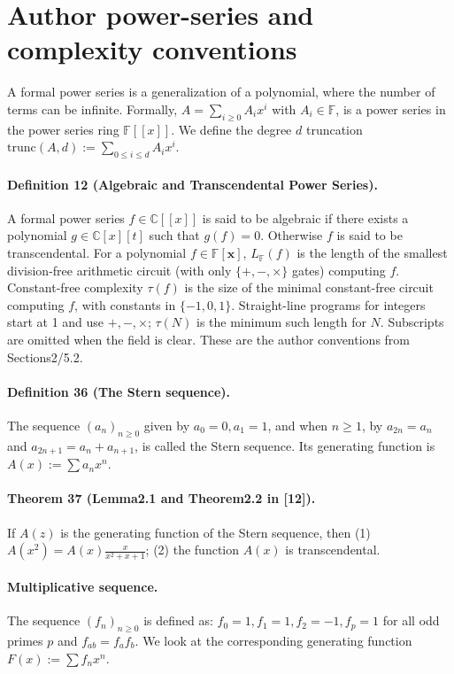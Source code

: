 \section*{Author power-series and complexity conventions}
A formal power series is a generalization of a polynomial, where the number of terms can be infinite. Formally, $A=\sum_{i\ge0}A_ix^i$ with $A_i\in\mathbb F$, is a power series in the power series ring $\mathbb F[[x]]$. We define the degree $d$ truncation $\mathrm{trunc}(A,d):=\sum_{0\le i\le d}A_ix^i$.
\paragraph{Definition 12 (Algebraic and Transcendental Power Series).} A formal power series $f\in\mathbb C[[x]]$ is said to be algebraic if there exists a polynomial $g\in\mathbb C[x][t]$ such that $g(f)=0$. Otherwise $f$ is said to be transcendental.
For a polynomial $f\in\mathbb F[\mathbf x]$, $L_{\mathbb F}(f)$ is the length of the smallest division-free arithmetic circuit (with only $\{+,-,\times\}$ gates) computing $f$. Constant-free complexity $\tau(f)$ is the size of the minimal constant-free circuit computing $f$, with constants in $\{-1,0,1\}$. Straight-line programs for integers start at 1 and use $+,-,\times$; $\tau(N)$ is the minimum such length for $N$. Subscripts are omitted when the field is clear. These are the author conventions from Sections2/5.2.
\paragraph{Definition 36 (The Stern sequence).} The sequence $(a_n)_{n\ge0}$ given by $a_0=0,a_1=1$, and when $n\ge1$, by $a_{2n}=a_n$ and $a_{2n+1}=a_n+a_{n+1}$, is called the Stern sequence. Its generating function is $A(x):=\sum a_nx^n$.
\paragraph{Theorem 37 (Lemma2.1 and Theorem2.2 in [12]).} If $A(z)$ is the generating function of the Stern sequence, then (1) $A(x^2)=A(x)\frac{x}{x^2+x+1}$; (2) the function $A(x)$ is transcendental.
\paragraph{Multiplicative sequence.} The sequence $(f_n)_{n\ge0}$ is defined as: $f_0=1,f_1=1,f_2=-1,f_p=1$ for all odd primes $p$ and $f_{ab}=f_af_b$. We look at the corresponding generating function $F(x):=\sum f_nx^n$.
